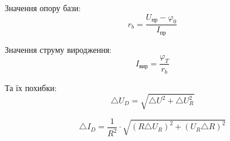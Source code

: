 \documentclass[a4paper,14pt]{extreport}
\begin{document}
Значення опору бази:
\begin{equation}
r_b = \dfrac{U_{\text{пр}} - \varphi_0}{I_{\text{пр}}}
\end{equation}

Значення струму виродження:
\begin{equation}
I_{\text{вир}} = \dfrac{\varphi_T}{r_b}
\end{equation}

Та їх похибки:
\begin{equation}
\triangle U_D = \sqrt{\triangle U^2 +\triangle U_R^2 }
\label{eq:ref}
\end{equation}

\begin{equation}
\triangle I_D = \dfrac 1{R^2} \cdot \sqrt {(R\triangle U_R)^2 + (U_R\triangle R)^2}
\label{eq:ref}
\end{equation}
\end{document}
